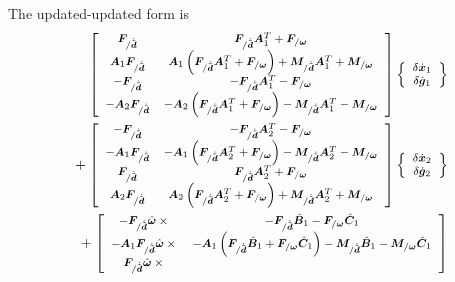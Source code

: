 \documentclass[10pt,fleqn,subeqn]{report}
\newcommand{\T}[1]{\bm{#1}}
\newcommand{\TT}[1]{\bm{#1}}
\begin{document}
The updated-updated form is
\begin{align}
	\footnotesize
	\sqbr{\matr{cc}{
		\T{F}_{/\dot{\tilde{\T{d}}}} 
		& \T{F}_{/\dot{\tilde{\T{d}}}} \TT{A}_1^T
			+ \T{F}_{/\T{\omega}}
		\\
%
		\TT{A}_1 \T{F}_{/\dot{\tilde{\T{d}}}} 
		& \TT{A}_1 \plbr{
			\T{F}_{/\dot{\tilde{\T{d}}}} \TT{A}_1^T
			+ \T{F}_{/\T{\omega}}
		}
			+ \T{M}_{/\dot{\tilde{\T{d}}}} \TT{A}_1^T
			+ \T{M}_{/\T{\omega}}
		\\
%
		- \T{F}_{/\dot{\tilde{\T{d}}}} 
		& - \T{F}_{/\dot{\tilde{\T{d}}}} \TT{A}_1^T
			- \T{F}_{/\T{\omega}}
		\\
%
		- \TT{A}_2 \T{F}_{/\dot{\tilde{\T{d}}}} 
		& - \TT{A}_2 \plbr{
			\T{F}_{/\dot{\tilde{\T{d}}}} \TT{A}_1^T
			+ \T{F}_{/\T{\omega}}
		}
			- \T{M}_{/\dot{\tilde{\T{d}}}} \TT{A}_1^T
			- \T{M}_{/\T{\omega}}
	}} \cubr{\cvvect{
		\delta\dot{\T{x}}_1 \\
		\delta\dot{\T{g}}_1
	}} & \nonumber \\
	\footnotesize
	\mbox{} + \sqbr{\matr{cc}{
		- \T{F}_{/\dot{\tilde{\T{d}}}}
		& - \T{F}_{/\dot{\tilde{\T{d}}}} \TT{A}_2^T
			- \T{F}_{/\T{\omega}}
		\\
%
		- \TT{A}_1 \T{F}_{/\dot{\tilde{\T{d}}}}
		& - \TT{A}_1 \plbr{
			\T{F}_{/\dot{\tilde{\T{d}}}} \TT{A}_2^T
			+ \T{F}_{/\T{\omega}}
		}
			- \T{M}_{/\dot{\tilde{\T{d}}}} \TT{A}_2^T
			- \T{M}_{/\T{\omega}}
		\\
%
		\T{F}_{/\dot{\tilde{\T{d}}}}
		& \T{F}_{/\dot{\tilde{\T{d}}}} \TT{A}_2^T
			+ \T{F}_{/\T{\omega}}
		\\
%
		\TT{A}_2 \T{F}_{/\dot{\tilde{\T{d}}}}
		& \TT{A}_2 \plbr{
			\T{F}_{/\dot{\tilde{\T{d}}}} \TT{A}_2^T
			+ \T{F}_{/\T{\omega}}
		}
			+ \T{M}_{/\dot{\tilde{\T{d}}}} \TT{A}_2^T
			+ \T{M}_{/\T{\omega}}
	}} \cubr{\cvvect{
		\delta\dot{\T{x}}_2 \\
		\delta\dot{\T{g}}_2
	}} & \nonumber \\
	\footnotesize
	\mbox{} + \sqbr{\matr{cc}{
		- \T{F}_{/\dot{\tilde{\T{d}}}} \hat{\T{\omega}}\times{}
		& - \T{F}_{/\dot{\tilde{\T{d}}}} \hat{\TT{B}}_1
			- \T{F}_{/\T{\omega}} \hat{\TT{C}}_1
		\\
%
		- \TT{A}_1 \T{F}_{/\dot{\tilde{\T{d}}}} \hat{\T{\omega}}\times{}
		& - \TT{A}_1 \plbr{
			\T{F}_{/\dot{\tilde{\T{d}}}} \hat{\TT{B}}_1
			+ \T{F}_{/\T{\omega}} \hat{\TT{C}}_1
		}
		- \T{M}_{/\dot{\tilde{\T{d}}}} \hat{\TT{B}}_1
			- \T{M}_{/\T{\omega}} \hat{\TT{C}}_1
		\\
%
		\T{F}_{/\dot{\tilde{\T{d}}}} \hat{\T{\omega}}\times{}
}}
\end{align}
\end{document}
